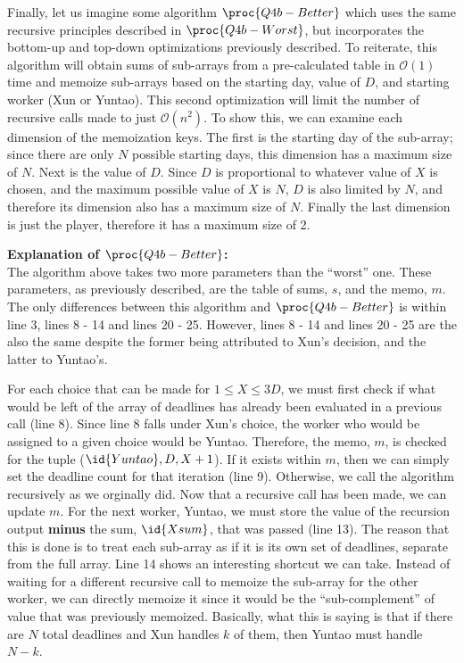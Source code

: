     Finally, let us imagine some algorithm $\proc{Q4b-Better}$ which uses the same recursive principles described in $\proc{Q4b-Worst}$, but incorporates the bottom-up and top-down optimizations previously described.
    To reiterate, this algorithm will obtain sums of sub-arrays from a pre-calculated table in $\mathcal{O}(1)$ time and memoize sub-arrays based on the starting day, value of $D$, and starting worker (Xun or Yuntao).
    This second optimization will limit the number of recursive calls made to just $\mathcal{O}(n^2)$.
    To show this, we can examine each dimension of the memoization keys.
    The first is the starting day of the sub-array; since there are only $N$ possible starting days, this dimension has a maximum size of $N$.
    Next is the value of $D$.
    Since $D$ is proportional to whatever value of $X$ is chosen, and the maximum possible value of $X$ is $N$, $D$ is also limited by $N$, and therefore its dimension also has a maximum size of $N$.
    Finally the last dimension is just the player, therefore it has a maximum size of 2.

    \textbf{Explanation of $\proc{Q4b-Better}$:}\\
    The algorithm above takes two more parameters than the ``worst'' one.
    These parameters, as previously described, are the table of sums, $s$, and the memo, $m$.
    The only differences between this algorithm and $\proc{Q4b-Better}$ is within line 3, lines 8 - 14 and lines 20 - 25.
    However, lines 8 - 14 and lines 20 - 25 are the also the same despite the former being attributed to Xun's decision, and the latter to Yuntao's.

    For each choice that can be made for $1 \le X \le 3D$, we must first check if what would be left of the array of deadlines has already been evaluated in a previous call (line 8).
    Since line 8 falls under Xun's choice, the worker who would be assigned to a given choice would be Yuntao.
    Therefore, the memo, $m$, is checked for the tuple ($\id{Yuntao}, D, X + 1$).
    If it exists within $m$, then we can simply set the deadline count for that iteration (line 9).
    Otherwise, we call the algorithm recursively as we orginally did.
    Now that a recursive call has been made, we can update $m$.
    For the next worker, Yuntao, we must store the value of the recursion output \textbf{minus} the sum, $\id{Xsum}$, that was passed (line 13).
    The reason that this is done is to treat each sub-array as if it is its own set of deadlines, separate from the full array.
    Line 14 shows an interesting shortcut we can take.
    Instead of waiting for a different recursive call to memoize the sub-array for the other worker, we can directly memoize it since it would be the ``sub-complement'' of value that was previously memoized.
    Basically, what this is saying is that if there are $N$ total deadlines and Xun handles $k$ of them, then Yuntao must handle $N - k$. \\

